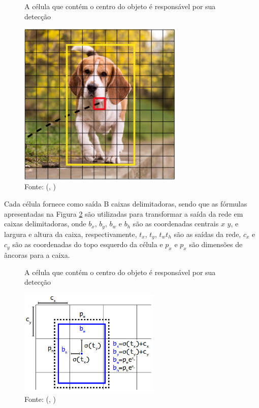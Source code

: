 \documentclass[]{politex}
\begin{document}
\begin{figure}[H]
    \centering
    \caption{A célula que contém o centro do objeto é responsável por sua detecção}
    \includegraphics[width=0.7\textwidth]{YOLO_grid}
    \caption*{Fonte: (, \citeyear{kathuria})}
    \label{fig:yolo_grid}
\end{figure}

Cada célula fornece como saída B caixas delimitadoras, sendo que as fórmulas apresentadas na Figura \ref{fig:yolo_grid_formula} são utilizadas para transformar a saída da rede em caixas delimitadoras, onde \(b_x\), \(b_y\), \(b_w\) e \(b_h\) são as coordenadas centrais \(x\) \(y\), e largura e altura da caixa, respectivamente, \(t_x\), \(t_y\), \(t_w t_h\) são as saídas da rede, \(c_x\) e \(c_y\) são as coordenadas do topo esquerdo da célula e \(p_x\) e \(p_x\) são dimensões de âncoras para a caixa.

\begin{figure}[H]
    \caption{A célula que contém o centro do objeto é responsável por sua detecção}
    \centering
    \includegraphics[width=0.6\textwidth]{Bounding_box_dimension_and_location}
    \caption*{Fonte: (, \citeyear{yolov1})}
    \label{fig:yolo_grid_formula}
\end{figure}
\end{document}
